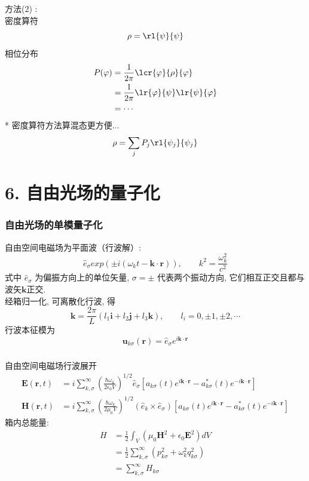 \begin{frame} 
\frametitle{}
     方法(2) : \\
     密度算符
     \[ \rho = \rl{\psi}{\psi} \]
     相位分布
     \[ \begin{aligned}
      P(\varphi) &= \frac{1}{2 \pi} \lcr{\varphi}{\rho} {\varphi} \\
      &= \frac{1}{2 \pi} \lr{\varphi}{\psi} \lr{\psi}{\varphi} \\
      &= \cdots
    \end{aligned}\] 
     * 密度算符方法算混态更方便...
     \[ \rho = \sum_j P_j\rl{\psi_j}{\psi_j} \]
\end{frame}

\section{6. 自由光场的量子化}

\begin{frame}
      \frametitle{自由光场的单模量子化}
      自由空间电磁场为平面波（行波解）:
      \[  \hat{e}_\sigma exp (\pm i (\omega_k t - \mathbf{k}\cdot \mathbf{r})), \qquad k^2 =\frac{\omega_k ^2}{c^2} \]
      式中 $\hat{e}_\sigma $ 为偏振方向上的单位矢量, $\sigma=\pm$ 代表两个振动方向, 它们相互正交且都与波矢$\mathbf{k}$正交. \\ \vspace*{1em} 
      经箱归一化, 可离散化行波, 得 
      \[ \mathbf{k} = \frac{2\pi}{L} (l_1 \mathbf{i} + l_2 \mathbf{j}+ l_3 \mathbf{k}), \qquad l_i= 0, \pm 1, \pm 2, \cdots \]
      行波本征模为
      \[ \mathbf{u}_{k\sigma} (\mathbf{r}) = \hat{e}_\sigma e^{i \mathbf{k}\cdot \mathbf{r}}\]
\end{frame} 

\begin{frame}
      \frametitle{}
    自由空间电磁场行波展开
      \[   \begin{aligned}
        \mathbf{E} (\mathbf{r},t) &=i \sum^\infty _{k,\sigma} (\frac{\hbar\omega_k}{2 \epsilon_0 V } )^{1/2} \hat{e}_\sigma [ a_{k\sigma} (t) e^{i \mathbf{k}\cdot \mathbf{r}} - a ^* _{k\sigma} (t)  e^{-i \mathbf{k}\cdot \mathbf{r}}] \\
      \mathbf{H} (\mathbf{r},t) &=i \sum^\infty _{k,\sigma} (\frac{\hbar\omega_k}{2 \mu_0 V } )^{1/2} (\hat{e}_k \times \hat{e}_\sigma) [ a_{k\sigma} (t) e^{i \mathbf{k}\cdot \mathbf{r}} - a ^* _{k\sigma} (t)  e^{-i \mathbf{k}\cdot \mathbf{r}}] 
      \end{aligned} \]
    箱内总能量:
      \[ \begin{aligned}
        H &= \frac{1}{2} \int_V (\mu_0 \mathbf{H}^2 + \epsilon_0 \mathbf{E}^2) dV \\ 
        &= \frac{1}{2}\sum^\infty _{k,\sigma} (p_{k\sigma} ^2 + \omega_k ^2 q_{k\sigma} ^2 )  \\ 
        & = \sum^\infty _{k,\sigma} H_{k\sigma}
      \end{aligned} 
      \] 
\end{frame}

